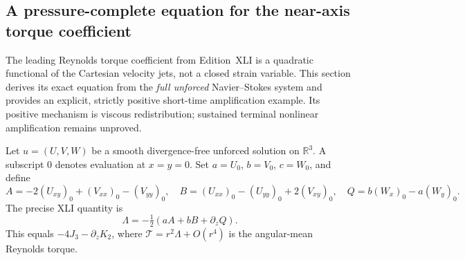 
\subsection{A pressure-complete equation for the near-axis torque coefficient}
\label{sec:xlii-jet}

The leading Reynolds torque coefficient from Edition~XLI is a quadratic
functional of the Cartesian velocity jets, not a closed strain variable.
This section derives its exact equation from the \emph{full unforced}
Navier--Stokes system and provides an explicit, strictly positive
short-time amplification example. Its positive mechanism is
viscous redistribution; sustained terminal nonlinear amplification
remains unproved.

Let $u=(U,V,W)$ be a smooth divergence-free unforced solution on
$\mathbb R^3$. A subscript $0$ denotes evaluation at $x=y=0$.
Set $a=U_0$, $b=V_0$, $c=W_0$, and define
\[
A=-2(U_{xy})_0+(V_{xx})_0-(V_{yy})_0,\quad
B=(U_{xx})_0-(U_{yy})_0+2(V_{xy})_0,\quad
Q=b(W_x)_0-a(W_y)_0.
\]
The precise XLI quantity is
\begin{equation}\label{eq:xlii-lambda}
\boxed{\quad \Lambda=-\tfrac12(aA+bB+\partial_zQ).\quad}
\end{equation}
This equals $-4J_3-\partial_zK_2$, where
$\mathcal T=r^2\Lambda+O(r^4)$ is the angular-mean
Reynolds torque.

